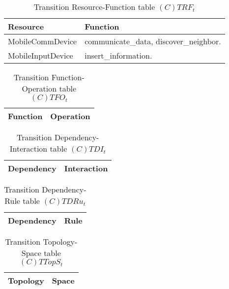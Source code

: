 \begin{table}[H]
	\centering
	\begin{tabular}{|p{4cm}|p{8cm}|}
			\hline
			\textbf{Resource} & \textbf{Function} \\
			\hline
			MobileCommDevice & communicate\_data, discover\_neighbor. \\
			\hline
			MobileInputDevice & insert\_information. \\
			\hline
			
		\end{tabular}
	\caption{Transition Resource-Function table $(C)TRF_t$}
	\label{tab:ctrft}
\end{table}

\begin{table}[H]
	\centering
	\begin{tabular}{|p{4cm}|p{8cm}|}
			\hline
			\textbf{Function} & \textbf{Operation} \\
			\hline
		\end{tabular}
	\caption{Transition Function-Operation table $(C)TFO_t$}
	\label{tab:ctfot}
\end{table}

\begin{table}[H]
	\centering
	\begin{tabular}{|p{4cm}|p{8cm}|}
			\hline
			\textbf{Dependency} & \textbf{Interaction} \\
			\hline
		\end{tabular}
	\caption{Transition Dependency-Interaction table $(C)TDI_t$}
	\label{tab:ctdit}
\end{table}

\begin{table}[H]
	\centering
	\begin{tabular}{|p{4cm}|p{8cm}|}
			\hline
			\textbf{Dependency} & \textbf{Rule} \\
			\hline
		\end{tabular}
	\caption{Transition Dependency-Rule table $(C)TDRu_t$}
	\label{tab:ctdrut}
\end{table}

\begin{table}[H]
	\centering
	\begin{tabular}{|p{4cm}|p{8cm}|}
			\hline
			\textbf{Topology} & \textbf{Space} \\
			\hline
		\end{tabular}
	\caption{Transition Topology-Space table $(C)TTopS_t$}
	\label{tab:cttopst}
\end{table}

